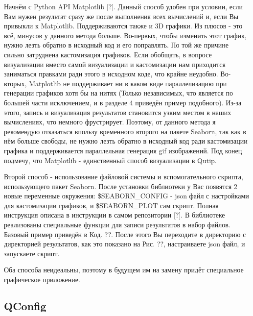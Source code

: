 \documentclass[aps,twocolumn,pra,showpacs,amsmath,amssymb,showkeys,10pt]{revtex4-2}
\begin{document}
    Начнём с Python API Matplotlib [?]. Данный способ удобен при условии, если Вам нужен результат сразу же после выполнения всех вычислений и, если Вы привыкли к Matplotlib. Поддерживаются также и 3D графики.
    Из плюсов - это всё, минусов у данного метода больше. Во-первых, чтобы изменить этот график, нужно лезть обратно в исходный код и его поправлять. По той же причине сильно затруднена кастомизация 
    графиков. Если обобщать, в вопросе визуализации вместо самой визуализации и кастомизации нам приходится заниматься правками ради этого в исходном коде, что крайне неудобно. Во-вторых, Matplotlib 
    не поддерживает ни в каком виде параллелизацию при генерации графиков хотя бы на нитях (Только независимых, что является по большей части исключением, и в разделе 4 приведён пример подобного).
    Из-за этого, запись и визуализация результатов становится узким местом в наших вычислениях, что немного фрустрирует. Поэтому, от данного метода я рекомендую отказаться впользу временного второго на 
    пакете Seaborn, так как в нём больше свободы, не нужно лезть обратно в исходный код ради кастомизации графика и поддерживается параллельная генерация gif изображений. 
    Под конец подмечу, что Matplotlib - единственный способ визуализации в Qutip.

    Второй способ - использование файловой системы и вспомогательного скрипта, использующего пакет Seaborn. После установки библиотеки у Вас появятся 2 новые переменные окружения: \$SEABORN\_CONFIG - 
    json файл с настройками для кастомизации графиков, и \$SEABORN\_PLOT сам скрипт. Полная инструкция описана в инструкции в самом репозитории [?]. В библиотеке реализованы специальные функции
    для записи результатов в набор файлов. Базовый пример приведён в Код. ??. После этого Вы переходите в директорию с директорией результатов, как это показано на Рис. ??, настраиваете json файл, 
    и запускаете скрипт.

    Оба способа неидеальны, поэтому в будущем им на замену придёт специальное графическое приложение.

    \subsection{QConfig}
\end{document}
